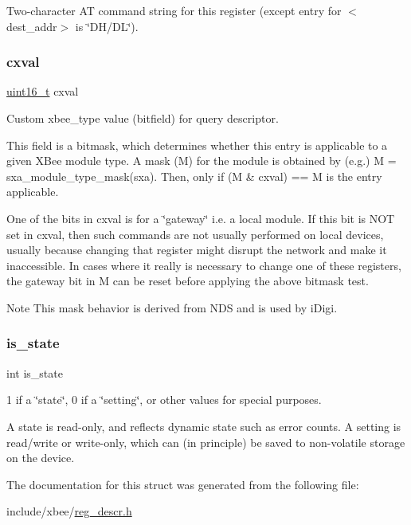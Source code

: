 Two-\/character AT command string for this register (except entry for $<$dest\+\_\+addr$>$ is \char`\"{}\+D\+H/\+D\+L\char`\"{}). 

\mbox{\label{struct__xbee__reg__descr__t_aa89979f0cabc914d3df82120cb9aa1a4}} 
\subsubsection{\texorpdfstring{cxval}{cxval}}
{\footnotesize\ttfamily \hyperlink{group__hal__dos_ga5a8b2dc9e45a9ee81a94ef304fb62505}{uint16\+\_\+t} cxval}



Custom xbee\+\_\+type value (bitfield) for query descriptor. 

This field is a bitmask, which determines whether this entry is applicable to a given X\+Bee module type. A mask (M) for the module is obtained by (e.\+g.) M = sxa\+\_\+module\+\_\+type\+\_\+mask(sxa). Then, only if (M \& cxval) == M is the entry applicable.

One of the bits in cxval is for a \char`\"{}gateway\char`\"{} i.\+e. a local module. If this bit is N\+OT set in cxval, then such commands are not usually performed on local devices, usually because changing that register might disrupt the network and make it inaccessible. In cases where it really is necessary to change one of these registers, the gateway bit in M can be reset before applying the above bitmask test.

\begin{DoxyNote}{Note}
This mask behavior is derived from N\+DS and is used by i\+Digi. 
\end{DoxyNote}
\mbox{\label{struct__xbee__reg__descr__t_ad94e63af9aef7b2c583788852ebdc5b1}} 
\subsubsection{\texorpdfstring{is\+\_\+state}{is\_state}}
{\footnotesize\ttfamily int is\+\_\+state}



1 if a \char`\"{}state\char`\"{}, 0 if a \char`\"{}setting\char`\"{}, or other values for special purposes. 

A state is read-\/only, and reflects dynamic state such as error counts. A setting is read/write or write-\/only, which can (in principle) be saved to non-\/volatile storage on the device. 

The documentation for this struct was generated from the following file\+:\begin{DoxyCompactItemize}
\item 
include/xbee/\hyperlink{reg__descr_8h}{reg\+\_\+descr.\+h}\end{DoxyCompactItemize}
